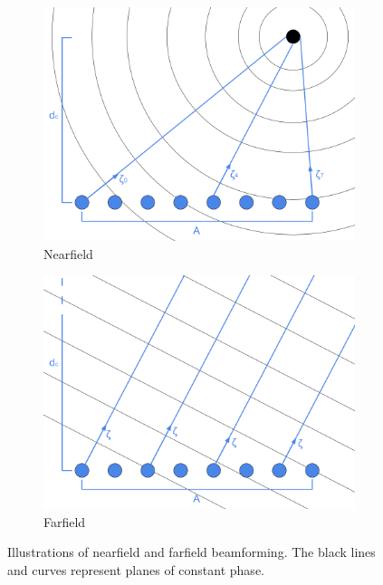 \begin{figure}[ht]
    \centering
    \begin{subfigure}[b]{0.48\linewidth}
        \includegraphics[width=\linewidth]{./images/background/nearfield.png}
        \caption{Nearfield}
    \end{subfigure}
    \quad
    \begin{subfigure}[b]{0.48\linewidth}
        \includegraphics[width=\linewidth]{./images/background/farfield.png}
        \caption{Farfield}
    \end{subfigure}
	\caption{Illustrations of nearfield and farfield beamforming. The black lines and curves represent planes of constant phase.}
	\label{fig:farfield}
\end{figure}


